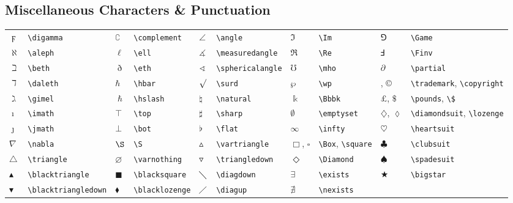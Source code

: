 \documentclass[10pt, english]{article}
\begin{document}
	\subsection{Miscellaneous Characters \& Punctuation}

	\begin{center}
		\scriptsize
	\begin{tabular}{ll|ll|ll|ll|ll}
		$\digamma$ & \verb|\digamma| & $\complement$ & \verb|\complement| & $\angle$ & \verb|\angle| & $\Im$ & \verb|\Im| & $\Game$ & \verb|\Game| \\ 
		$\aleph$ & \verb|\aleph| & $\ell$ & \verb|\ell| & $\measuredangle$ & \verb|\measuredangle| & $\Re$ & \verb|\Re| & $\Finv$ & \verb|\Finv| \\
		$\beth$ & \verb|\beth| & $\eth$ & \verb|\eth| & $\sphericalangle$ & \verb|\sphericalangle| & $\mho$ & \verb|\mho| & $\partial$ & \verb|\partial| \\
		$\daleth$ & \verb|\daleth| & $\hbar$ & \verb|\hbar| & $\surd$ & \verb|\surd| & $\wp$ & \verb|\wp| & \texttrademark, \copyright & \verb|\trademark|, \verb|\copyright| \\
		$\gimel$ & \verb|\gimel| & $\hslash$ & \verb|\hslash| & $\natural$ & \verb|\natural| & $\Bbbk$ & \verb|\Bbbk| & $\pounds$, $\$$ & \verb|\pounds|, \verb|\$| \\
		$\imath$ & \verb|\imath| & $\top$ & \verb|\top| & $\sharp$ & \verb|\sharp| & $\emptyset$ & \verb|\emptyset| & $\diamondsuit$, $\lozenge$ & \verb|\diamondsuit|, \verb|\lozenge| \\
		$\jmath$ & \verb|\jmath| & $\bot$ & \verb|\bot| & $\flat$ & \verb|\flat| & $\infty$ & \verb|\infty| & $\heartsuit$ & \verb|\heartsuit| \\
		$\nabla$ & \verb|\nabla| & $\S$ & \verb|\S| & $\vartriangle$ & \verb|\vartriangle| & $\Box$, $\square$ & \verb|\Box|, \verb|\square| & $\clubsuit$ & \verb|\clubsuit| \\
		$\triangle$ & \verb|\triangle| & $\varnothing$ & \verb|\varnothing| & $\triangledown$ & \verb|\triangledown| & $\Diamond$ & \verb|\Diamond| & $\spadesuit$ & \verb|\spadesuit| \\
		$\blacktriangle$ & \verb|\blacktriangle| & $\blacksquare$ & \verb|\blacksquare| & $\diagdown$ & \verb|\diagdown| & $\exists$ & \verb|\exists| & $\bigstar$ & \verb|\bigstar| \\
		$\blacktriangledown$ & \verb|\blacktriangledown| & $\blacklozenge$ & \verb|\blacklozenge| & $\diagup$ & \verb|\diagup| & $\nexists$ & \verb|\nexists| \\ 
	\end{tabular}
	\end{center}
\end{document}
